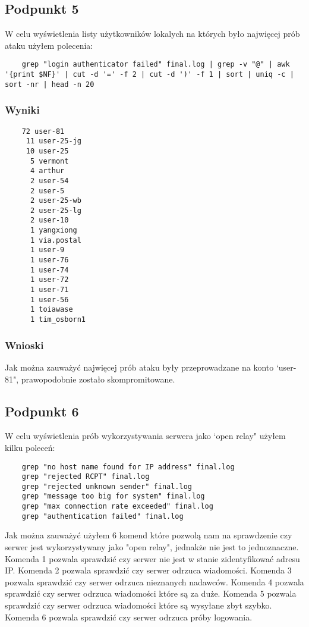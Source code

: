 \documentclass{article}
\begin{document}
\subsection{Podpunkt 5}
W celu wyświetlenia listy użytkowników lokalych na których było najwięcej prób ataku użyłem polecenia:
\begin{verbatim}
    grep "login authenticator failed" final.log | grep -v "@" | awk '{print $NF}' | cut -d '=' -f 2 | cut -d ')' -f 1 | sort | uniq -c | sort -nr | head -n 20
\end{verbatim}
\subsubsection{Wyniki}
\begin{verbatim}
    72 user-81
     11 user-25-jg
     10 user-25
      5 vermont
      4 arthur
      2 user-54
      2 user-5
      2 user-25-wb
      2 user-25-lg
      2 user-10
      1 yangxiong
      1 via.postal
      1 user-9
      1 user-76
      1 user-74
      1 user-72
      1 user-71
      1 user-56
      1 toiawase
      1 tim_osborn1
\end{verbatim}
\subsubsection{Wnioski}
Jak można zauważyć najwięcej prób ataku były przeprowadzane na konto `user-81", prawopodobnie zostało skompromitowane.
\subsection{Podpunkt 6}
W celu wyświetlenia prób wykorzystywania serwera jako `open relay" użyłem kilku poleceń:
\begin{verbatim}
    grep "no host name found for IP address" final.log
    grep "rejected RCPT" final.log
    grep "rejected unknown sender" final.log
    grep "message too big for system" final.log
    grep "max connection rate exceeded" final.log
    grep "authentication failed" final.log
\end{verbatim}
Jak można zauważyć użyłem 6 komend które pozwolą nam na sprawdzenie czy serwer jest wykorzystywany jako "open relay", jednakże nie jest to jednoznaczne.
Komenda 1 pozwala sprawdzić czy serwer nie jest w stanie zidentyfikować adresu IP.
Komenda 2 pozwala sprawdzić czy serwer odrzuca wiadomości.
Komenda 3 pozwala sprawdzić czy serwer odrzuca nieznanych nadawców.
Komenda 4 pozwala sprawdzić czy serwer odrzuca wiadomości które są za duże.
Komenda 5 pozwala sprawdzić czy serwer odrzuca wiadomości które są wysyłane zbyt szybko.
Komenda 6 pozwala sprawdzić czy serwer odrzuca próby logowania.
\end{document}
